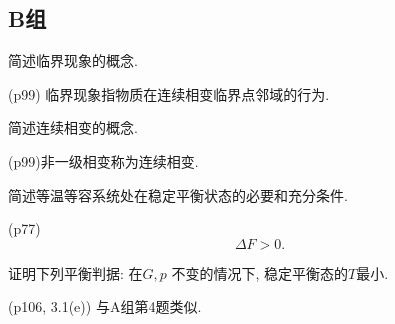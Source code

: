 \subsection{B组}
\begin{questions}
  \question 简述临界现象的概念.
  \begin{solution}
    (p99) 临界现象指物质在连续相变临界点邻域的行为.
  \end{solution}
  \question 简述连续相变的概念.
  \begin{solution}
    (p99)非一级相变称为连续相变.
  \end{solution}
  \question 简述等温等容系统处在稳定平衡状态的必要和充分条件.
  \begin{solution}
    (p77)
    \begin{equation}
      \Delta F > 0.
    \end{equation}
  \end{solution}
  \question 证明下列平衡判据: 在$G, p$ 不变的情况下, 稳定平衡态的$T$最小.
  \begin{solution}
    (p106, 3.1(e)) 与A组第4题类似.
  \end{solution}
\end{questions}